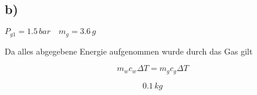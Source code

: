 

\subsection*{b)}
$P_{g1} = 1.5\,bar \quad m_g = 3.6\,g$

Da alles abgegebene Energie aufgenommen wurde durch das Gas gilt

\[
m_w c_w \Delta T = m_g c_g \Delta T
\]

\[
0.1\,kg
\]